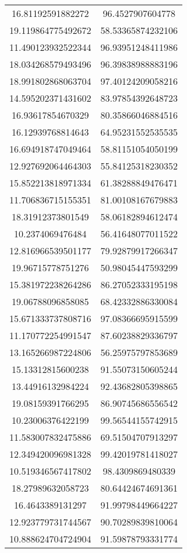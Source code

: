\begin{table}
\begin{tabular}{cc}
16.81192591882272 & 96.4527907604778 \\
19.119864775492672 & 58.53365874232106 \\
11.490123932522344 & 96.93951248411986 \\
18.034268579493496 & 96.39838988883196 \\
18.991802868063704 & 97.40124209058216 \\
14.595202371431602 & 83.97854392648723 \\
16.93617854670329 & 80.35866046884516 \\
16.12939768814643 & 64.95231552535535 \\
16.694918747049464 & 58.81151054050199 \\
12.927692064464303 & 55.84125318230352 \\
15.852213818971334 & 61.38288849476471 \\
11.706836715155351 & 81.00108167679883 \\
18.31912373801549 & 58.06182894612474 \\
10.2374069476484 & 56.41648077011522 \\
12.816966539501177 & 79.92879917266347 \\
19.96715778751276 & 50.98045447593299 \\
15.381972238264286 & 86.27052333195198 \\
19.06788096858085 & 68.42332886330084 \\
15.671333737808716 & 97.08366695915599 \\
11.170772254991547 & 87.60238829336797 \\
13.165266987224806 & 56.25975797853689 \\
15.13312815600238 & 91.55073150605244 \\
13.44916132984224 & 92.43682805398865 \\
19.08159391766295 & 86.90745686556542 \\
10.23006376422199 & 99.56544155742915 \\
11.583007832475886 & 69.51504707913297 \\
12.349420096981328 & 99.42019781418027 \\
10.519346567417802 & 98.4309869480339 \\
18.27989632058723 & 80.64424674691361 \\
16.4643389131297 & 91.99798449664227 \\
12.923779731744567 & 90.70289839810064 \\
10.888624704724904 & 91.59878793331774 \\

\end{tabular}
\end{table}
